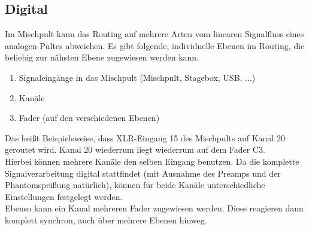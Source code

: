 		\subsection{Digital}
			Im Mischpult kann das Routing auf mehrere Arten vom linearen Signalfluss eines analogen Pultes abweichen.
			Es gibt folgende, individuelle Ebenen im Routing, die beliebig zur nähsten Ebene zugewiesen werden kann.
			\begin{enumerate}
				\item Signaleingänge in das Mischpult (Mischpult, Stagebox, USB, ...)
				\item Kanäle
				\item Fader (auf den verschiedenen Ebenen)
			\end{enumerate}
			Das heißt Beispielsweise, dass XLR-Eingang 15 des Mischpults auf Kanal 20 geroutet wird.
			Kanal 20 wiederrum liegt wiederrum auf dem Fader C3.
			\\Hierbei können mehrere Kanäle den selben Eingang benutzen.
			Da die komplette Signalverarbeitung digital stattfindet (mit Ausnahme des Preamps und der Phantomspeißung natürlich), können für beide Kanäle unterschiedliche Einstellungen festgelegt werden.
			\\Ebenso kann ein Kanal mehreren Fader zugewiesen werden.
			Diese reagieren dann komplett synchron, auch über mehrere Ebenen hinweg.